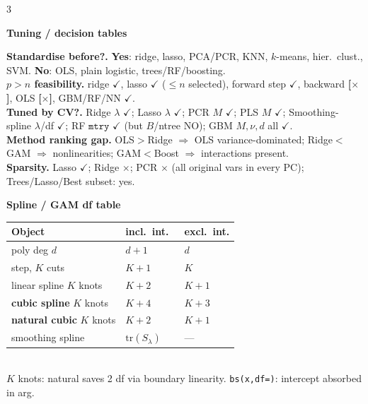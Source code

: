 \documentclass[a4paper,8pt]{extarticle}
\renewcommand{\section}[1]{\par\vspace{2pt}\noindent\colorbox{black!15}{\parbox{0.97\linewidth}{\strut\bfseries\small #1}}\par\vspace{1pt}}
\newcommand{\hd}[1]{\textbf{#1.}}
\newcommand{\tr}[1]{\textcolor{red!70!black}{\textbf{[#1]}}} %
\newcommand{\Tr}{\mathrm{tr}}
\begin{document}
\begin{multicols*}{3}
\section{Tuning / decision tables}
\hd{Standardise before?} \textbf{Yes}: ridge, lasso, PCA/PCR, KNN, $k$-means, hier.\ clust., SVM. \textbf{No}: OLS, plain logistic, trees/RF/boosting.\\
\hd{$p>n$ feasibility} ridge $\checkmark$, lasso $\checkmark$ ($\le n$ selected), forward step $\checkmark$, backward \tr{$\times$}, OLS \tr{$\times$}, GBM/RF/NN $\checkmark$.\\
\hd{Tuned by CV?} Ridge $\lambda$ $\checkmark$; Lasso $\lambda$ $\checkmark$; PCR $M$ $\checkmark$; PLS $M$ $\checkmark$; Smoothing-spline $\lambda$/df $\checkmark$; RF $\mathtt{mtry}$ $\checkmark$ (but $B$/ntree NO); GBM $M,\nu,d$ all $\checkmark$.\\
\hd{Method ranking gap} OLS$>$Ridge $\Rightarrow$ OLS variance-dominated; Ridge$<$GAM $\Rightarrow$ nonlinearities; GAM$<$Boost $\Rightarrow$ interactions present.\\
\hd{Sparsity} Lasso $\checkmark$; Ridge $\times$; PCR $\times$ (all original vars in every PC); Trees/Lasso/Best subset: yes.

\section{Spline / GAM df table}
{\centering
\begin{tabular}{lll}\hline
Object & incl.\ int.\ & excl.\ int. \\\hline
poly deg $d$ & $d{+}1$ & $d$ \\
step, $K$ cuts & $K{+}1$ & $K$ \\
linear spline $K$ knots & $K{+}2$ & $K{+}1$ \\
\textbf{cubic spline} $K$ knots & $K{+}4$ & $K{+}3$ \\
\textbf{natural cubic} $K$ knots & $K{+}2$ & $K{+}1$ \\
smoothing spline & $\Tr(S_\lambda)$ & --- \\\hline
\end{tabular}}\\
$K$ knots: natural saves 2 df via boundary linearity. \texttt{bs(x,df=)}: intercept absorbed in arg.


\end{multicols*}
\end{document}
